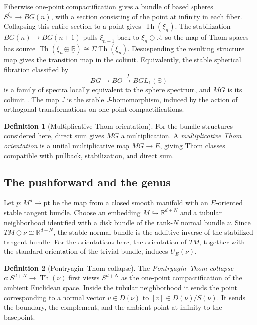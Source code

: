 \documentclass[11pt]{article}
\theoremstyle{definition}
\newtheorem{defn}{Definition}[section]
\newcommand{\Th}{\operatorname{Th}}
\begin{document}
Fiberwise one-point compactification gives a bundle of based spheres \(S^{\xi_n}\to BG(n)\), with a section consisting of the point at infinity in each fiber. Collapsing this entire section to a point gives \(\Th(\xi_n)\). The stabilization \(BG(n)\to BG(n+1)\) pulls \(\xi_{n+1}\) back to \(\xi_n\oplus\underline{\mathbb R}\), so the map of Thom spaces has source \(\Th(\xi_n\oplus\underline{\mathbb R})\cong\Sigma\Th(\xi_n)\). Desuspending the resulting structure map gives the transition map in the colimit. Equivalently, the stable spherical fibration classified by
\[
 BG\longrightarrow BO\xrightarrow{J}BGL_1(\mathbb S)
\]
is a family of spectra locally equivalent to the sphere spectrum, and \(MG\) is its colimit \cite{ABGHR}. The map \(J\) is the stable \(J\)-homomorphism, induced by the action of orthogonal transformations on one-point compactifications.

\begin{defn}[Multiplicative Thom orientation]
For the bundle structures considered here, direct sum gives \(MG\) a multiplication. A \emph{multiplicative Thom orientation} is a unital multiplicative map \(MG\to E\), giving Thom classes compatible with pullback, stabilization, and direct sum.
\end{defn}

\subsection{The pushforward and the genus}
Let \(p:M^d\to\mathrm{pt}\) be the map from a closed smooth manifold with an \(E\)-oriented stable tangent bundle. Choose an embedding \(M\hookrightarrow\mathbb R^{d+N}\) and a tubular neighborhood identified with a disk bundle of the rank-\(N\) normal bundle \(\nu\). Since \(TM\oplus\nu\cong\underline{\mathbb R}^{d+N}\), the stable normal bundle is the additive inverse of the stabilized tangent bundle. For the orientations here, the orientation of \(TM\), together with the standard orientation of the trivial bundle, induces \(U_E(\nu)\).

\begin{defn}[Pontryagin--Thom collapse]
The \emph{Pontryagin--Thom collapse} \(c:S^{d+N}\to\Th(\nu)\) first views \(S^{d+N}\) as the one-point compactification of the ambient Euclidean space. Inside the tubular neighborhood it sends the point corresponding to a normal vector \(v\in D(\nu)\) to \([v]\in D(\nu)/S(\nu)\). It sends the boundary, the complement, and the ambient point at infinity to the basepoint.
\end{defn}
\end{document}
